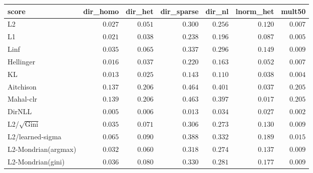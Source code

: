 \begin{tabular}{lrrrrrr}
\toprule
score & dir\_homo & dir\_het & dir\_sparse & dir\_nl & lnorm\_het & mult50 \\
\midrule
L2 & $0.027$ & $0.051$ & $0.300$ & $0.256$ & $0.120$ & $0.007$ \\
L1 & $0.021$ & $0.038$ & $0.238$ & $0.196$ & $0.087$ & $0.005$ \\
Linf & $0.035$ & $0.065$ & $0.337$ & $0.296$ & $0.149$ & $0.009$ \\
Hellinger & $0.016$ & $0.037$ & $0.220$ & $0.163$ & $0.052$ & $0.007$ \\
KL & $0.013$ & $0.025$ & $0.143$ & $0.110$ & $0.038$ & $0.004$ \\
Aitchison & $0.137$ & $0.206$ & $0.464$ & $0.401$ & $0.037$ & $0.205$ \\
Mahal-clr & $0.139$ & $0.206$ & $0.463$ & $0.397$ & $\mathbf{0.017}$ & $0.205$ \\
DirNLL & $\mathbf{0.005}$ & $\mathbf{0.006}$ & $\mathbf{0.013}$ & $\mathbf{0.034}$ & $0.027$ & $\mathbf{0.002}$ \\
L2/$\sqrt{\mathrm{Gini}}$ & $0.035$ & $0.071$ & $0.306$ & $0.273$ & $0.130$ & $0.009$ \\
L2/learned-sigma & $0.065$ & $0.090$ & $0.388$ & $0.332$ & $0.189$ & $0.015$ \\
L2-Mondrian(argmax) & $0.032$ & $0.060$ & $0.318$ & $0.274$ & $0.137$ & $0.009$ \\
L2-Mondrian(gini) & $0.036$ & $0.080$ & $0.330$ & $0.281$ & $0.177$ & $0.009$ \\
\bottomrule
\end{tabular}